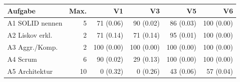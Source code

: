 \begin{tabular}{lrrrrr}
\toprule
Aufgabe & Max. & V1 & V3 & V5 & V6 \\
\midrule
A1 SOLID nennen & 5 & 71 (0.06) & 90 (0.02) & 86 (0.03) & 100 (0.00) \\
A2 Liskov erkl. & 2 & 71 (0.14) & 71 (0.14) & 95 (0.01) & 100 (0.00) \\
A3 Aggr./Komp. & 2 & 100 (0.00) & 100 (0.00) & 100 (0.00) & 100 (0.00) \\
A4 Scrum & 6 & 90 (0.02) & 29 (0.13) & 100 (0.00) & 100 (0.00) \\
A5 Architektur & 10 & 0 (0.32) & 0 (0.26) & 43 (0.06) & 57 (0.04) \\
\bottomrule
\end{tabular}